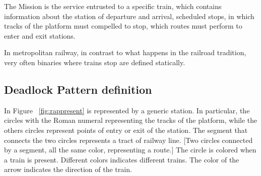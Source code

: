 \documentclass{ewic}
\begin{document}
The Mission is the service entrusted to a specific train, which contains information about the station of departure and arrival, scheduled stops, in which tracks of the platform must compelled to stop, which routes must perform to enter and exit stations.
 


In metropolitan railway, in contrast to what happens in the railroad tradition, very often binaries where trains stop are defined statically.
 



 



\subsection{Deadlock Pattern definition}

In Figure ~\ref{fig:rappresent} is represented by a generic station.
In particular, the circles with the Roman numeral representing the tracks of the platform, while the others circles represent points of entry or exit of the station.
The segment that connects the two circles represents a tract of railway line.
  [Two circles connected by a segment, all the same color, representing a route.]
The circle is colored when a train is present. Different colors indicates different trains. The color of the arrow indicates the direction of the train.
\end{document}
